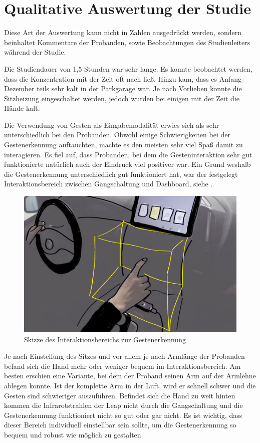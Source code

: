 \section[Qualitative Auswertung]{Qualitative Auswertung der Studie}
Diese Art der Auswertung kann nicht in Zahlen ausgedrückt werden, sondern beinhaltet Kommentare der Probanden, sowie Beobachtungen des Studienleiters während der Studie.

Die Studiendauer von 1,5 Stunden war sehr lange. Es konnte beobachtet werden, dass die Konzentration mit der Zeit oft nach ließ. Hinzu kam, dass es Anfang Dezember teils sehr kalt in der Parkgarage war. Je nach Vorlieben konnte die Sitzheizung eingeschaltet werden, jedoch wurden bei einigen mit der Zeit die Hände kalt. 

Die Verwendung von Gesten als Eingabemodalität erwies sich als sehr unterschiedlich bei den Probanden. Obwohl einige Schwierigkeiten bei der Gestenerkennung auftauchten, machte es den meisten sehr viel Spaß damit zu interagieren. Es fiel auf, dass Probanden, bei dem die Gesteninteraktion sehr gut funktionierte natürlich auch der Eindruck viel positiver war. Ein Grund weshalb die Gestenerkennung unterschiedlich gut funktioniert hat, war der festgelegt Interaktionsbereich zwischen Gangschaltung und Dashboard, siehe . 
\begin{figure}
	\centering
		\includegraphics[width=1\textwidth]{img/GestenbereichSkizze2.jpg}
	\caption{Skizze des Interaktionsbereichs zur Gestenerkennung}
	\label{fig:GestenbereichSkizze}
\end{figure}

Je nach Einstellung des Sitzes und vor allem je nach Armlänge der Probanden befand sich die Hand mehr oder weniger bequem im Interaktionsbereich. Am besten erschien eine Variante, bei dem der Proband seinen Arm auf der Armlehne ablegen konnte. Ist der komplette Arm in der Luft, wird er schnell schwer und die Gesten sind schwieriger auszuführen. Befindet sich die Hand zu weit hinten kommen die Infrarotstrahlen der Leap nicht durch die Gangschaltung und die Gestenerkennung funktioniert nicht so gut oder gar nicht. Es ist wichtig, dass dieser Bereich individuell einstellbar sein sollte, um die Gestenerkennung so bequem und robust wie möglich zu gestalten.

